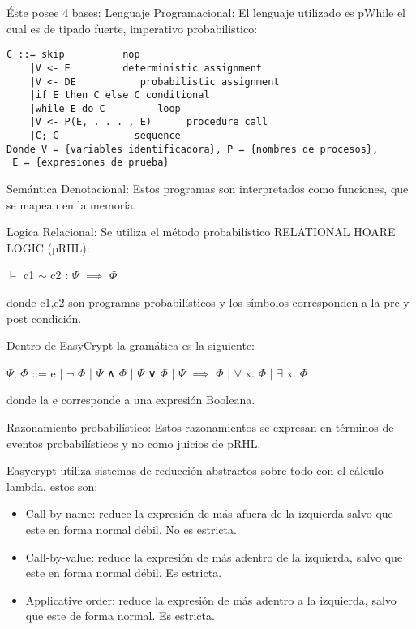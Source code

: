 \documentclass[runningheads,a4paper]{llncs}
\begin{document}
Éste posee 4 bases:
Lenguaje Programacional:
El lenguaje utilizado es pWhile el cual es de tipado fuerte, imperativo probabilistico:

\begin{Verbatim}
C ::= skip		 	nop
	|V <- E		    deterministic assignment
	|V <- DE		   probabilistic assignment
	|if E then C else C	conditional
	|while E do C	      loop
	|V <- P(E, . . . , E)      procedure call
	|C; C		      sequence
Donde V = {variables identificadora}, P = {nombres de procesos},
 E = {expresiones de prueba}
\end{Verbatim}

Semántica Denotacional:
Estos programas son interpretados como funciones, que se mapean en la memoria.

Logica Relacional: Se utiliza el método probabilístico RELATIONAL HOARE LOGIC (pRHL):
		
\centerline{$\models$ c1 $\sim$ c2 : $\Psi$ $\implies$ $\Phi$}	
			
donde c1,c2 son programas probabilísticos y los símbolos corresponden a la pre y post condición.

Dentro de EasyCrypt la gramática es la siguiente:

\centerline{$\Psi$, $\Phi$ ::= e $\mid$ $\neg$ $\Phi$ $\mid$ $\Psi$ ∧ $\Phi$ $\mid$ $\Psi$ ∨ $\Phi$ $\mid$ $\Psi$ $\implies$ $\Phi$ $\mid$ $\forall$ x. $\Phi$ $\mid$ $\exists$ x. $\Phi$}

donde la e corresponde a una expresión Booleana.


Razonamiento probabilístico:
Estos razonamientos se expresan en términos de eventos probabilísticos y no como juicios de pRHL.\cite{article5}


Easycrypt utiliza sistemas de reducción abstractos sobre todo con el cálculo lambda, estos son:

\begin{itemize}

	\item Call-by-name: reduce la expresión de más afuera de la izquierda salvo que este en forma normal débil. No es estricta.

	\item Call-by-value: reduce la expresión de más adentro de la izquierda, salvo que este en forma normal débil. Es estricta.

	\item Applicative order: reduce la expresión de más adentro a la izquierda, salvo que este de forma normal. Es estricta.
\end{itemize}
\end{document}
